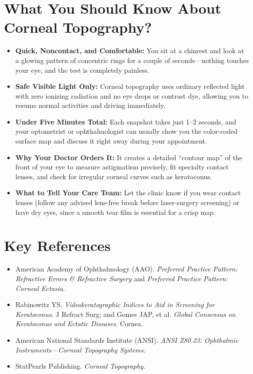 \section{What You Should Know About Corneal Topography?}
\begin{itemize}
    \item \textbf{Quick, Noncontact, and Comfortable:} You sit at a chinrest and look at a glowing pattern of concentric rings for a couple of seconds---nothing touches your eye, and the test is completely painless.
    \item \textbf{Safe Visible Light Only:} Corneal topography uses ordinary reflected light with zero ionizing radiation and no eye drops or contrast dye, allowing you to resume normal activities and driving immediately.
    \item \textbf{Under Five Minutes Total:} Each snapshot takes just 1--2 seconds, and your optometrist or ophthalmologist can usually show you the color-coded surface map and discuss it right away during your appointment.
    \item \textbf{Why Your Doctor Orders It:} It creates a detailed ``contour map'' of the front of your eye to measure astigmatism precisely, fit specialty contact lenses, and check for irregular corneal curves such as keratoconus.
    \item \textbf{What to Tell Your Care Team:} Let the clinic know if you wear contact lenses (follow any advised lens-free break before laser-surgery screening) or have dry eyes, since a smooth tear film is essential for a crisp map.
\end{itemize}

\section{Key References}
\begin{itemize}
    \item American Academy of Ophthalmology (AAO). \textit{Preferred Practice Pattern: Refractive Errors \& Refractive Surgery} and \textit{Preferred Practice Pattern: Corneal Ectasia}.
    \item Rabinowitz YS. \textit{Videokeratographic Indices to Aid in Screening for Keratoconus}. J Refract Surg; and Gomes JAP, et al. \textit{Global Consensus on Keratoconus and Ectatic Diseases}. Cornea.
    \item American National Standards Institute (ANSI). \textit{ANSI Z80.23: Ophthalmic Instruments---Corneal Topography Systems}.
    \item StatPearls Publishing. \textit{Corneal Topography}.
\end{itemize}
